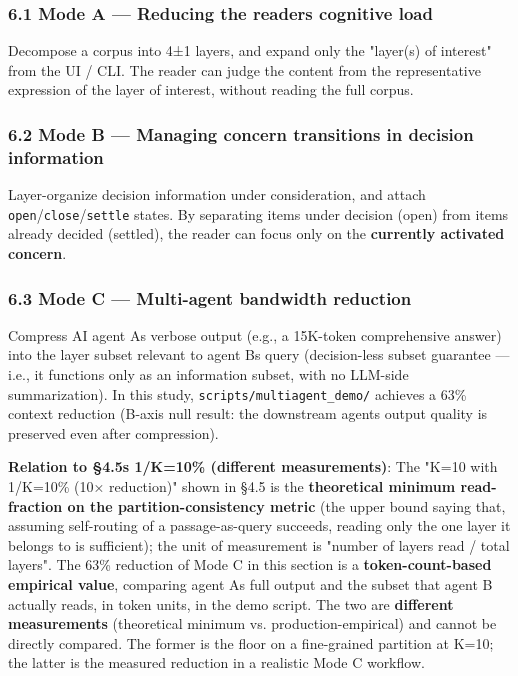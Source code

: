 \documentclass[
]{article}
\begin{document}
\subsubsection{6.1 Mode A --- Reducing the reader\textquotesingle s
cognitive load}\label{61-mode-a--reducing-the-readers-cognitive-load}

Decompose a corpus into 4±1 layers, and expand only the "layer(s) of
interest" from the UI / CLI. The reader can judge the content from the
representative expression of the layer of interest, without reading the
full corpus.

\subsubsection{6.2 Mode B --- Managing concern transitions in decision
information}\label{62-mode-b--managing-concern-transitions-in-decision-information}

Layer-organize decision information under consideration, and attach
\texttt{open}/\texttt{close}/\texttt{settle} states. By separating items
under decision (open) from items already decided (settled), the reader
can focus only on the \textbf{currently activated concern}.

\subsubsection{6.3 Mode C --- Multi-agent bandwidth
reduction}\label{63-mode-c--multi-agent-bandwidth-reduction}

Compress AI agent A\textquotesingle s verbose output (e.g., a 15K-token
comprehensive answer) into the layer subset relevant to agent
B\textquotesingle s query (decision-less subset guarantee --- i.e., it
functions only as an information subset, with no LLM-side
summarization). In this study, \texttt{scripts/multiagent\_demo/}
achieves a 63\% context reduction (B-axis null result: the downstream
agent\textquotesingle s output quality is preserved even after
compression).

\textbf{Relation to §4.5\textquotesingle s 1/K=10\% (different
measurements)}: The "K=10 with 1/K=10\% (10× reduction)" shown in §4.5
is the \textbf{theoretical minimum read-fraction on the
partition-consistency metric} (the upper bound saying that, assuming
self-routing of a passage-as-query succeeds, reading only the one layer
it belongs to is sufficient); the unit of measurement is "number of
layers read / total layers". The 63\% reduction of Mode C in this
section is a \textbf{token-count-based empirical value}, comparing agent
A\textquotesingle s full output and the subset that agent B actually
reads, in token units, in the demo script. The two are \textbf{different
measurements} (theoretical minimum vs. production-empirical) and cannot
be directly compared. The former is the floor on a fine-grained
partition at K=10; the latter is the measured reduction in a realistic
Mode C workflow.
\end{document}

